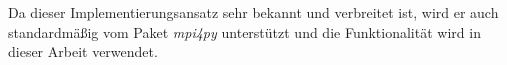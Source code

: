 \\\\
Da dieser Implementierungsansatz sehr bekannt und verbreitet ist, wird er auch standardmäßig vom Paket \emph{mpi4py} unterstützt und die Funktionalität wird in dieser Arbeit verwendet. 

